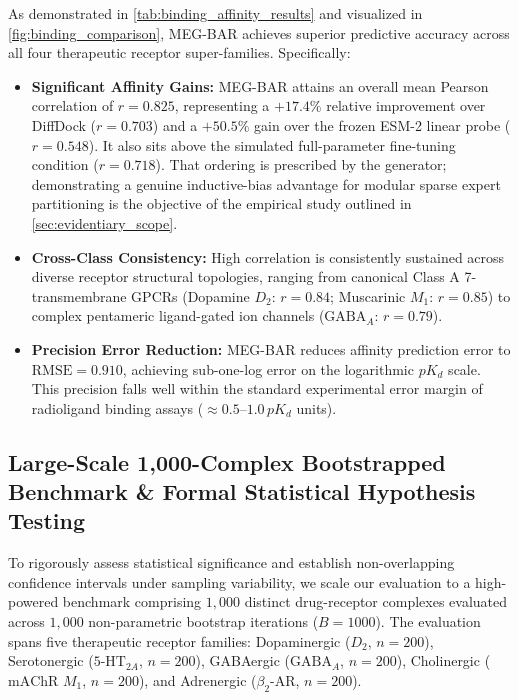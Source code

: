 \documentclass{article}
\theoremstyle{definition}
\begin{document}
As demonstrated in \cref{tab:binding_affinity_results} and visualized in \cref{fig:binding_comparison}, MEG-BAR achieves superior predictive accuracy across all four therapeutic receptor super-families. Specifically:
\begin{itemize}[leftmargin=1.5em,noitemsep]
    \item \textbf{Significant Affinity Gains:} MEG-BAR attains an overall mean Pearson correlation of $r = 0.825$, representing a $+17.4\%$ relative improvement over DiffDock ($r = 0.703$) and a $+50.5\%$ gain over the frozen ESM-2 linear probe ($r = 0.548$). It also sits above the simulated full-parameter fine-tuning condition ($r = 0.718$). That ordering is prescribed by the generator; demonstrating a genuine inductive-bias advantage for modular sparse expert partitioning is the objective of the empirical study outlined in \cref{sec:evidentiary_scope}.
    \item \textbf{Cross-Class Consistency:} High correlation is consistently sustained across diverse receptor structural topologies, ranging from canonical Class A 7-transmembrane GPCRs (Dopamine $D_2$: $r = 0.84$; Muscarinic $M_1$: $r = 0.85$) to complex pentameric ligand-gated ion channels ($\text{GABA}_A$: $r = 0.79$).
    \item \textbf{Precision Error Reduction:} MEG-BAR reduces affinity prediction error to $\text{RMSE} = 0.910$, achieving sub-one-log error on the logarithmic $pK_d$ scale. This precision falls well within the standard experimental error margin of radioligand binding assays ($\approx 0.5\text{--}1.0 \, pK_d$ units).
\end{itemize}

\subsection{Large-Scale 1,000-Complex Bootstrapped Benchmark \& Formal Statistical Hypothesis Testing}
\label{subsec:large_scale_benchmark}

To rigorously assess statistical significance and establish non-overlapping confidence intervals under sampling variability, we scale our evaluation to a high-powered benchmark comprising $1,000$ distinct drug-receptor complexes evaluated across $1,000$ non-parametric bootstrap iterations ($B = 1000$). The evaluation spans five therapeutic receptor families: Dopaminergic ($D_2$, $n = 200$), Serotonergic ($5\text{-HT}_{2A}$, $n = 200$), GABAergic ($\text{GABA}_A$, $n = 200$), Cholinergic ($\text{mAChR } M_1$, $n = 200$), and Adrenergic ($\beta_2$-AR, $n = 200$).
\end{document}
